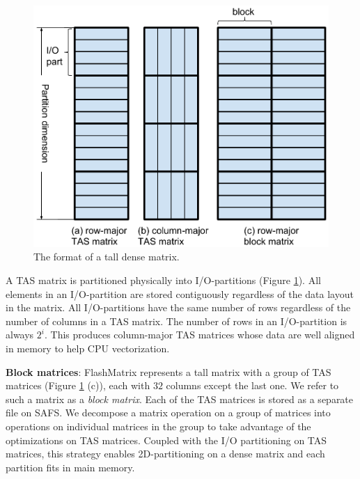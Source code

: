 \begin{figure}
	\centering
	\includegraphics[scale=0.5]{FlashMatrix_figs/dense_matrix2.pdf}
	\caption{The format of a tall dense matrix.}
	\label{fig:den_mat}
  \vspace{-12pt}
\end{figure}

A TAS matrix is partitioned physically into I/O-partitions (Figure
\ref{fig:den_mat}). 
All elements in an I/O-partition are stored
contiguously regardless of the data layout in the matrix. All 
I/O-partitions have the same number of rows regardless of
the number of columns in a TAS matrix. The number of rows in
an I/O-partition is always $2^i$. This produces column-major TAS
matrices whose data are well aligned in memory to help CPU vectorization.

\vspace{3pt}
\noindent \textbf{Block matrices}:
FlashMatrix represents a tall matrix with a group of TAS matrices (Figure
\ref{fig:den_mat} (c)), each with $32$ columns except the last one. We refer
to such a matrix as a \textit{block matrix}. Each of the TAS matrices is
stored as a separate file on SAFS. We decompose a matrix operation
on a group of matrices into operations on individual matrices in the group
to take advantage of the optimizations on TAS matrices.
Coupled with the I/O partitioning on TAS matrices, this strategy enables
2D-partitioning on a dense matrix and each partition fits in main memory.

